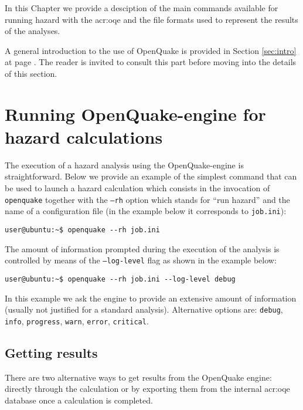 In this Chapter we provide a desciption of the main commands available
for running hazard with the \gls{acr:oqe} and the file formats used to 
represent the results of the analyses.

A general introduction to the use of OpenQuake is provided in Section 
\ref{sec:intro} at page \pageref{sec:intro}.
The reader is invited to consult this part before moving into
the details of this section.
\section{Running OpenQuake-engine for hazard calculations}
The execution of a hazard analysis using the OpenQuake-engine 
is straightforward. Below we provide an example of the simplest 
command that can be used to launch a hazard calculation which 
consists in the invocation of \texttt{openquake} together with 
the \texttt{--rh} option which stands for ``run hazard'' and 
the name of a configuration file (in the example below
it corresponds to \texttt{job.ini}):
\begin{Verbatim}[frame=single, commandchars=\\\{\}, fontsize=\small]
user@ubuntu:~$ openquake --rh job.ini
\end{Verbatim}

The amount of information prompted during the execution of the 
analysis is controlled by means of the \texttt{--log-level} flag 
as shown in the example below:
\begin{Verbatim}[frame=single, commandchars=\\\{\}, fontsize=\small]
user@ubuntu:~$ openquake --rh job.ini --log-level debug
\end{Verbatim}
In this example we ask the engine to provide an extensive amount
of information (usually not justified for a standard analysis). 
Alternative options are: \texttt{debug}, \texttt{info}, \texttt{progress},
\texttt{warn}, \texttt{error}, \texttt{critical}.
\subsection{Getting results}
There are two alternative ways to get results from the OpenQuake engine:
directly through the calculation or by exporting them from the 
internal \gls{acr:oqe} database once a calculation is completed. 

